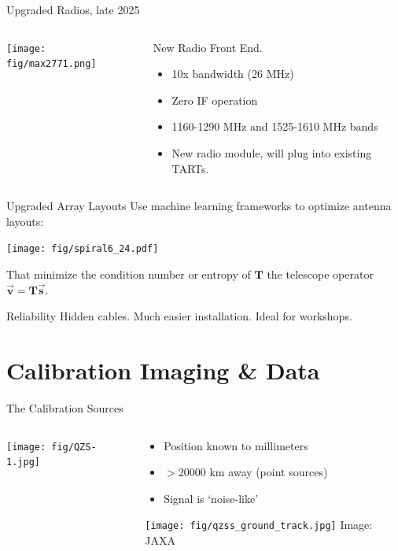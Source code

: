 \documentclass[ignorenonframetext]{beamer}
\begin{document}
\begin{frame}{Upgraded Radios, late 2025}
  \begin{columns}
  \begin{column}{0.4\linewidth}
    \texttt{[image: fig/max2771.png]}
  \end{column}
  \begin{column}{0.6\linewidth}
  New Radio Front End.
\begin{itemize}
 \item 10x bandwidth (26 MHz)
 \item Zero IF operation
 \item 1160-1290 MHz and 1525-1610 MHz bands
 \item New radio module, will plug into existing TARTs.
\end{itemize}

  \end{column}
  \end{columns}
\end{frame}

\begin{frame}{Upgraded Array Layouts}
 Use machine learning frameworks to optimize antenna layouts:

 \texttt{[image: fig/spiral6\_24.pdf]}

 That minimize the condition number or entropy of $\mathbf{T}$ the telescope operator $\overrightarrow{\mathbf{v}} = \mathbf{T} \overrightarrow{\mathbf{s}}$.

     \begin{block}{Reliability}
Hidden cables. Much easier installation. Ideal for workshops.
    \end{block}

\end{frame}

\section{Calibration Imaging \& Data}

\frame{\tableofcontents[currentsection]}


\begin{frame}{The Calibration Sources}
 \begin{columns}
  \begin{column}{0.5\linewidth}
   \texttt{[image: fig/QZS-1.jpg]}
  \end{column}
  \begin{column}{0.5\linewidth}
  \begin{itemize}
   \item Position known to millimeters
   \item $>20000$ km away (point sources)
   \item Signal is `noise-like'
  \end{itemize}
   \texttt{[image: fig/qzss\_ground\_track.jpg]}
   {\tiny Image: JAXA}
  \end{column}
 \end{columns}
\end{frame}
\end{document}
